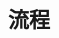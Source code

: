 \documentclass[titlepage, 12pt]{article}
\begin{document}
\begin{CJK}{UTF8}{bkai}
\newpage
\section*{流程}

\begin{enumerate}
  \itemize 
\end{enumerate}







\end{CJK}
\end{document}
